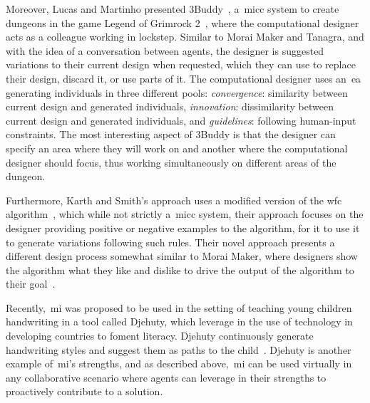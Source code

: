 
Moreover, Lucas and Martinho presented 3Buddy~\cite{lucas-3buddy-iccc2017}, a~\acrshort{micc} system to create dungeons in the game Legend of Grimrock 2~\cite{legGrim2}, where the computational designer acts as a colleague working in lockstep. Similar to Morai Maker and Tanagra, and with the idea of a conversation between agents, the designer is suggested variations to their current design when requested, which they can use to replace their design, discard it, or use parts of it. The computational designer uses an~\acrshort{ea} generating individuals in three different pools: \textit{convergence}: similarity between current design and generated individuals, \textit{innovation}: dissimilarity between current design and generated individuals, and \textit{guidelines}: following human-input constraints. The most interesting aspect of 3Buddy is that the designer can specify an area where they will work on and another where the computational designer should focus, thus working simultaneously on different areas of the dungeon.

Furthermore, Karth and Smith's approach uses a modified version of the wfc algorithm~\cite{Karth2017-WFC}, which while not strictly a~\acrshort{micc} system, their approach focuses on the designer providing positive or negative examples to the algorithm, for it to use it to generate variations following such rules. Their novel approach presents a different design process somewhat similar to Morai Maker, where designers show the algorithm what they like and dislike to drive the output of the algorithm to their goal~\cite{Karth2019-pcgmlDiscriminativeLearning}. 




Recently,~\acrshort{mi} was proposed to be used in the setting of teaching young children handwriting in a tool called Djehuty, which leverage in the use of technology in developing countries to foment literacy. Djehuty continuously generate handwriting styles and suggest them as paths to the child~\cite{Sarr2020-preschoolMixedInit}. Djehuty is another example of~\acrshort{mi}'s strengths, and as described above,~\acrshort{mi} can be used virtually in any collaborative scenario where agents can leverage in their strengths to proactively contribute to a solution. 

